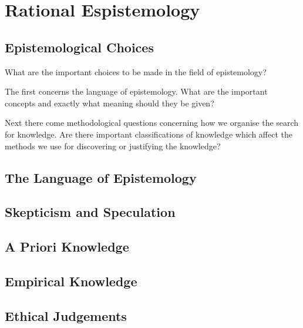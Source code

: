 \chapter{Rational Espistemology}\label{RationalEpistemology}

\section{Epistemological Choices}

What are the important choices to be made in the field of epistemology?

The first concerns the language of epistemology.
What are the important concepts and exactly what meaning should they be given?

Next there come methodological questions concerning how we organise the search for knowledge.
Are there important classifications of knowledge which affect the methods we use for discovering or justifying the knowledge?

\section{The Language of Epistemology}

\section{Skepticism and Speculation}

\section{A Priori Knowledge}

\section{Empirical Knowledge}

\section{Ethical Judgements}

